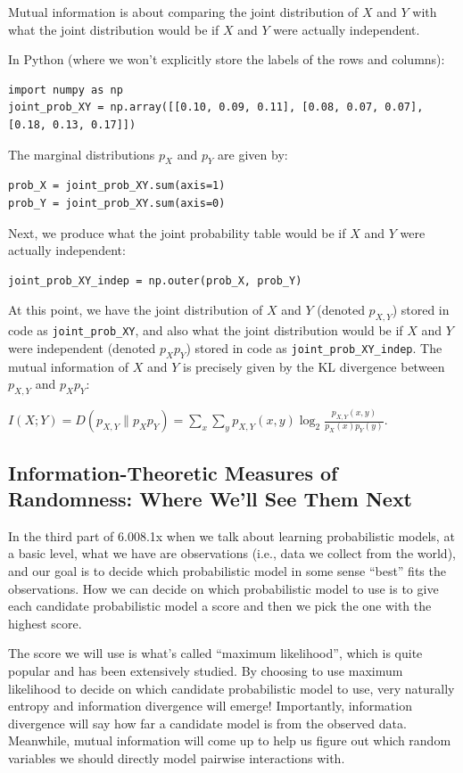 \documentclass[6008notes.tex]{subfiles}
\begin{document}
Mutual information is about comparing the joint distribution of $X$ and $Y$ with what the joint distribution would be if $X$ and $Y$ were actually independent.

In Python (where we won't explicitly store the labels of the rows and columns):

\begin{lstlisting}
import numpy as np
joint_prob_XY = np.array([[0.10, 0.09, 0.11], [0.08, 0.07, 0.07], [0.18, 0.13, 0.17]])
\end{lstlisting}

The marginal distributions $p_X$ and $p_Y$ are given by:

\begin{lstlisting}
prob_X = joint_prob_XY.sum(axis=1)
prob_Y = joint_prob_XY.sum(axis=0)
\end{lstlisting}

Next, we produce what the joint probability table would be if $X$ and $Y$ were actually independent:

\begin{lstlisting}
joint_prob_XY_indep = np.outer(prob_X, prob_Y)
\end{lstlisting}

At this point, we have the joint distribution of $X$ and $Y$ (denoted $p_{X,Y}$) stored in code as \lstinline{joint_prob_XY}, and also what the joint distribution would be if $X$ and $Y$ were independent (denoted $p_Xp_Y$) stored in code as \lstinline{joint_prob_XY_indep}. The mutual information of $X$ and $Y$ is precisely given by the KL divergence between $p_{X,Y}$ and $p_Xp_Y$:

{\centering$I(X;Y) = D(p_{X,Y}\parallel p_{X}p_{Y}) = \sum _ x \sum _ y p_{X, Y}(x, y) \log _2 \frac{p_{X, Y}(x, y)}{p_ X(x) p_ Y(y)}.$ \par}


\subsection{Information-Theoretic Measures of Randomness: Where We'll See Them Next}

In the third part of 6.008.1x when we talk about learning probabilistic models, at a basic level, what we have are observations (i.e., data we collect from the world), and our goal is to decide which probabilistic model in some sense ``best'' fits the observations. How we can decide on which probabilistic model to use is to give each candidate probabilistic model a score and then we pick the one with the highest score.

The score we will use is what's called ``maximum likelihood'', which is quite popular and has been extensively studied. By choosing to use maximum likelihood to decide on which candidate probabilistic model to use, very naturally entropy and information divergence will emerge! Importantly, information divergence will say how far a candidate model is from the observed data. Meanwhile, mutual information will come up to help us figure out which random variables we should directly model pairwise interactions with.
\end{document}
